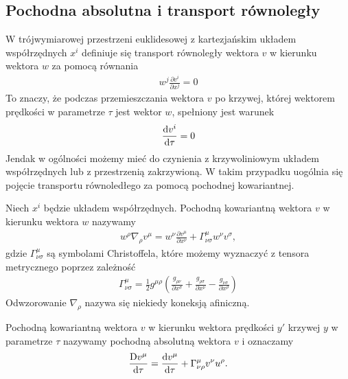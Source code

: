 \subsection{Pochodna absolutna i transport równoległy}
W trójwymiarowej przestrzeni euklidesowej 
z kartezjańskim układem współrzędnych $x^i$ 
definiuje się transport równoległy wektora $v$ w kierunku wektora 
$w$ za pomocą równania 
\begin{align*}
w^j \frac{\partial v^i}{\partial x^j} = 0
\end{align*}
To znaczy, że podczas przemieszczania wektora $v$ po krzywej, której
wektorem prędkości w parametrze $\tau$ jest wektor $w$, spełniony jest 
warunek
\begin{align*}
 \frac{\text{d} v^i}{\text{d} \tau} = 0
\end{align*}
Jendak w ogólności możemy mieć do czynienia z krzywoliniowym układem 
współrzędnych lub z przestrzenią zakrzywioną. W takim przypadku uogólnia
się pojęcie transportu równoledłego za pomocą pochodnej kowariantnej.
\begin{definition}
Niech $x^i$ będzie układem współrzędnych. 
Pochodną kowariantną wektora $v$ w kierunku wektora $w$ nazywamy
\begin{align*}
w^\rho \nabla_\rho v^\mu = w^\nu \frac{\partial v^\mu}{\partial x^\nu}
+ \Gamma^\mu_{\nu\sigma} w^\nu v^\sigma ,
\end{align*}
gdzie $\Gamma^\mu_{\nu\sigma} $ są symbolami Christoffela, które możemy
wyznaczyć z tensora metrycznego poprzez zależność
\begin{align*}
\Gamma^\mu_{\nu\sigma} = \frac{1}{2} g^{\mu\rho} 
\left(\frac{g_{\rho\nu}}{\partial x^\sigma}+ 
\frac{g_{\rho\sigma}}{\partial x^\nu}-
\frac{g_{\nu\sigma}}{\partial x^\rho}\right)
\end{align*}
Odwzorowanie $\nabla_\rho$ nazywa się niekiedy koneksją afiniczną.
\end{definition}
\begin{definition}
Pochodną kowariantną wektora $v$ w kierunku wektora prędkości
$y'$ krzywej $y$ w parametrze $\tau$ nazywamy
pochodną absolutną wektora $v$ i oznaczamy 
\begin{align*}
\frac{\text{D} v^\mu }{\text{d} \tau } = \frac{\text{d} v^\mu}{\text{d} \tau}
+ \Gamma^\mu_{\nu\rho} v^\nu u^\rho.
\end{align*}
\end{definition}
